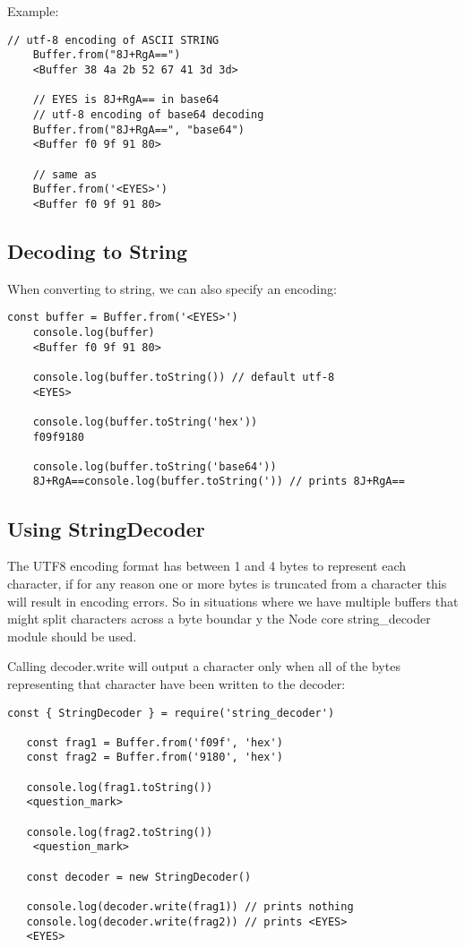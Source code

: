 \documentclass{scrartcl}
\begin{document}
Example:

\begin{lstlisting}[style=ES6]
    // utf-8 encoding of ASCII STRING
    Buffer.from("8J+RgA==")
    <Buffer 38 4a 2b 52 67 41 3d 3d>

    // EYES is 8J+RgA== in base64
    // utf-8 encoding of base64 decoding
    Buffer.from("8J+RgA==", "base64")
    <Buffer f0 9f 91 80>

    // same as
    Buffer.from('<EYES>')
    <Buffer f0 9f 91 80>
\end{lstlisting}

\subsection{Decoding to String}

When converting to string, we can also specify an encoding:

\begin{lstlisting}[style=ES6]
    const buffer = Buffer.from('<EYES>')
    console.log(buffer)
    <Buffer f0 9f 91 80>

    console.log(buffer.toString()) // default utf-8
    <EYES>

    console.log(buffer.toString('hex'))
    f09f9180

    console.log(buffer.toString('base64'))
    8J+RgA==console.log(buffer.toString(')) // prints 8J+RgA==
\end{lstlisting}



\subsection{Using StringDecoder}
The UTF8 encoding format has between 1 and 4 bytes to represent each character, if for any reason one or more bytes is truncated from a character this will result in encoding errors. So in situations where we have multiple buffers that might split characters across a byte boundar y the Node core string\_decoder module should be used.

 Calling decoder.write will output a character only when all of the bytes representing that character have been written to the decoder:

\begin{lstlisting}[style=ES6]
   const { StringDecoder } = require('string_decoder')

   const frag1 = Buffer.from('f09f', 'hex')
   const frag2 = Buffer.from('9180', 'hex')

   console.log(frag1.toString())
   <question_mark>

   console.log(frag2.toString())
    <question_mark>

   const decoder = new StringDecoder()

   console.log(decoder.write(frag1)) // prints nothing
   console.log(decoder.write(frag2)) // prints <EYES>
   <EYES>

\end{lstlisting}
\end{document}
